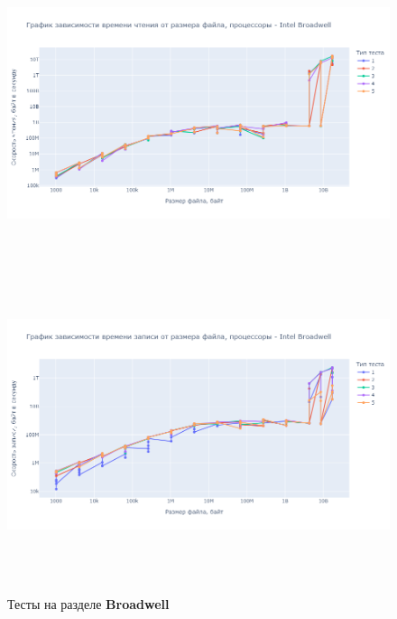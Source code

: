 \begin{figure}[h]
\includegraphics[height=9cm,keepaspectratio]{./test_graphs/read_broadwell.png}\\[0.1cm]
\includegraphics[height=9cm,keepaspectratio]{./test_graphs/write_broadwell.png}\\[0.1cm]
\caption{Тесты на разделе \textbf{Broadwell}}
\label{broadwell}
\end{figure}

